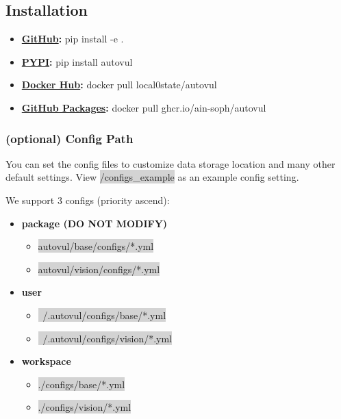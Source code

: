\documentclass[letterpaper,twocolumn,10pt]{article}
\begin{document}
{{%
\subsection{Installation}

{\small
\begin{itemize}
    \item {\bf \href{https://github.com/ain-soph/autovul}{GitHub}: } pip install -e .
    \item {\bf \href{https://pypi.org/project/autovul/}{PYPI}: } pip install autovul
    \item {\bf \href{https://hub.docker.com/r/local0state/autovul}{Docker Hub}: } docker pull local0state/autovul
    \item {\bf \href{https://github.com/ain-soph/autovul/pkgs/container/autovul}{GitHub Packages}: } docker pull ghcr.io/ain-soph/autovul
\end{itemize}

\subsubsection*{(optional) Config Path}
You can set the config files to customize data storage location and many other default settings. View \colorbox{lightgray}{/configs\_example} as an example config setting.

We support 3 configs (priority ascend):

{\small
\begin{itemize}
    \item {\bf package (DO NOT MODIFY)}
          \begin{itemize}
              \item \colorbox{lightgray}{autovul/base/configs/*.yml}
              \item \colorbox{lightgray}{autovul/vision/configs/*.yml}
          \end{itemize}
    \item {\bf user}
          \begin{itemize}
              \item \colorbox{lightgray}{~/.autovul/configs/base/*.yml}
              \item \colorbox{lightgray}{~/.autovul/configs/vision/*.yml}
          \end{itemize}
    \item {\bf workspace}
          \begin{itemize}
              \item \colorbox{lightgray}{./configs/base/*.yml}
              \item \colorbox{lightgray}{./configs/vision/*.yml}
          \end{itemize}
\end{itemize}

}}}}
\end{document}
